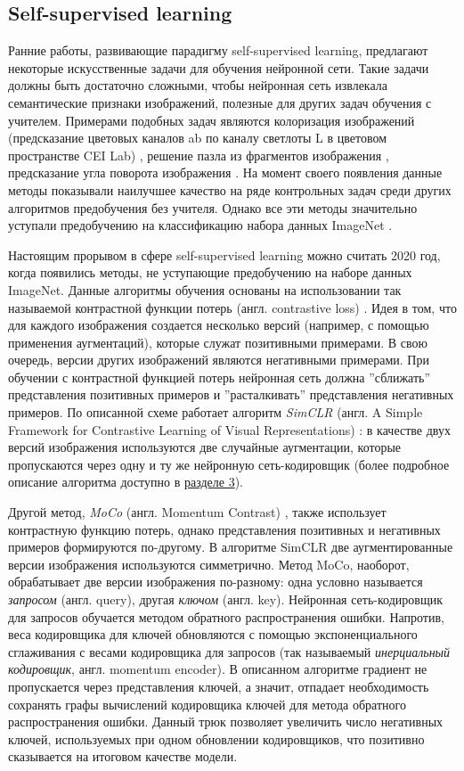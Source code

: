 \subsection{Self-supervised learning}

Ранние работы, развивающие парадигму self-supervised learning, предлагают некоторые искусственные задачи для обучения нейронной сети. Такие задачи должны быть достаточно сложными, чтобы нейронная сеть извлекала семантические признаки изображений, полезные для других задач обучения с учителем. Примерами подобных задач являются колоризация изображений (предсказание цветовых каналов ab по каналу светлоты L в цветовом пространстве CEI Lab) \cite{colorization}, решение пазла из фрагментов изображения \cite{jigsaw}, предсказание угла поворота изображения \cite{rotation}. На момент своего появления данные методы показывали наилучшее качество на ряде контрольных задач среди других алгоритмов предобучения без учителя. Однако все эти методы значительно уступали предобучению на классификацию набора данных ImageNet \cite{imagenet}.

Настоящим прорывом в сфере self-supervised learning можно считать 2020 год, когда появились методы, не уступающие предобучению на наборе данных ImageNet. Данные алгоритмы обучения основаны на использовании так называемой контрастной функции потерь (англ. contrastive loss) \cite{contrastive}. Идея в том, что для каждого изображения создается несколько версий (например, с помощью применения аугментаций), которые служат позитивными примерами. В свою очередь, версии других изображений являются негативными примерами. При обучении с контрастной функцией потерь нейронная сеть должна ''сближать'' представления позитивных примеров и ''расталкивать'' представления негативных примеров. По описанной схеме работает алгоритм \textit{SimCLR} (англ. A Simple Framework for Contrastive Learning of Visual Representations) \cite{simclr}: в качестве двух версий изображения используются две случайные аугментации, которые пропускаются через одну и ту же нейронную сеть-кодировщик (более подробное описание алгоритма доступно в \hyperref[simclr:1]{разделе 3}).

Другой метод, \textit{MoCo} (англ. Momentum Contrast) \cite{moco}, также использует контрастную функцию потерь, однако представления позитивных и негативных примеров формируются по-другому. В алгоритме SimCLR две аугментированные версии изображения используются симметрично. Метод MoCo, наоборот, обрабатывает две версии изображения по-разному: одна условно называется \textit{запросом} (англ. query), другая \textit{ключом} (англ. key). Нейронная сеть-кодировщик для запросов обучается методом обратного распространения ошибки. Напротив, веса кодировщика для ключей обновляются с помощью экспоненциального сглаживания с весами кодировщика для запросов (так называемый \textit{инерциальный кодировщик}, англ. momentum encoder). В описанном алгоритме градиент не пропускается через представления ключей, а значит, отпадает необходимость сохранять графы вычислений кодировщика ключей для метода обратного распространения ошибки. Данный трюк позволяет увеличить число негативных ключей, используемых при одном обновлении кодировщиков, что позитивно сказывается на итоговом качестве модели.

